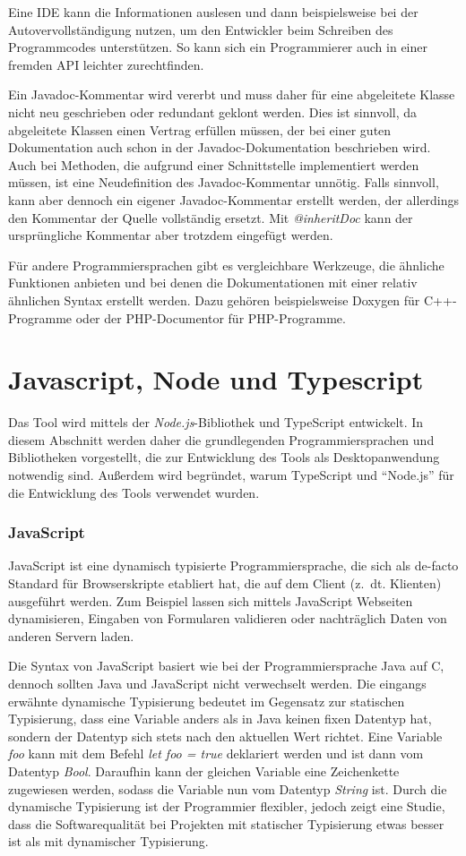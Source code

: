 Eine \ac{IDE} kann die Informationen auslesen und dann beispielsweise bei der Autovervollständigung nutzen, um den Entwickler beim Schreiben des Programmcodes unterstützen. So kann sich ein Programmierer auch in einer fremden \ac{API} leichter zurechtfinden.

Ein Javadoc-Kommentar wird vererbt und muss daher für eine abgeleitete Klasse nicht neu geschrieben oder redundant geklont werden. Dies ist sinnvoll, da abgeleitete Klassen einen Vertrag erfüllen müssen, der bei einer guten Dokumentation auch schon in der Javadoc-Dokumentation beschrieben wird. Auch bei Methoden, die aufgrund einer Schnittstelle implementiert werden müssen, ist eine Neudefinition des Javadoc-Kommentar unnötig. Falls sinnvoll, kann aber dennoch ein eigener Javadoc-Kommentar erstellt werden, der allerdings den Kommentar der Quelle vollständig ersetzt. Mit \textit{@inheritDoc} kann der ursprüngliche Kommentar aber trotzdem eingefügt werden.

Für andere Programmiersprachen gibt es vergleichbare Werkzeuge, die ähnliche Funktionen anbieten und bei denen die Dokumentationen mit einer relativ ähnlichen Syntax erstellt werden. Dazu gehören beispielsweise Doxygen für C++-Programme oder der PHP-Documentor für PHP-Programme. 


\section{Javascript, Node und Typescript}
Das Tool wird mittels der \textit{Node.js}-Bibliothek und TypeScript entwickelt.
In diesem Abschnitt werden daher die grundlegenden Programmiersprachen und Bibliotheken vorgestellt, die zur Entwicklung des Tools als Desktopanwendung notwendig sind. Außerdem wird begründet, warum TypeScript und \enquote{Node.js} für die Entwicklung des Tools verwendet wurden. 
\subsubsection{JavaScript}
JavaScript ist eine dynamisch typisierte Programmiersprache, die sich als de-facto Standard  für Browserskripte etabliert hat, die auf dem Client (z.~dt. Klienten) ausgeführt werden. Zum Beispiel lassen sich mittels JavaScript Webseiten dynamisieren, Eingaben von Formularen validieren oder nachträglich Daten von anderen Servern laden. 

Die Syntax von JavaScript basiert wie bei der Programmiersprache Java auf C, dennoch sollten Java und JavaScript nicht verwechselt werden. Die eingangs erwähnte dynamische Typisierung bedeutet im Gegensatz zur statischen Typisierung, dass eine Variable anders als in Java keinen fixen Datentyp hat, sondern der Datentyp sich stets nach den aktuellen Wert richtet. Eine Variable \textit{foo} kann mit dem Befehl \textit{ let foo = true} deklariert werden und ist dann vom Datentyp \textit{Bool}. Daraufhin kann der gleichen Variable eine Zeichenkette zugewiesen werden, sodass die Variable nun vom Datentyp \textit{String} ist. Durch die dynamische Typisierung ist der Programmier flexibler, jedoch zeigt eine Studie, dass die Softwarequalität bei Projekten mit statischer Typisierung etwas besser ist als mit dynamischer Typisierung\cite[S. 155ff.]{Ray2014}.

